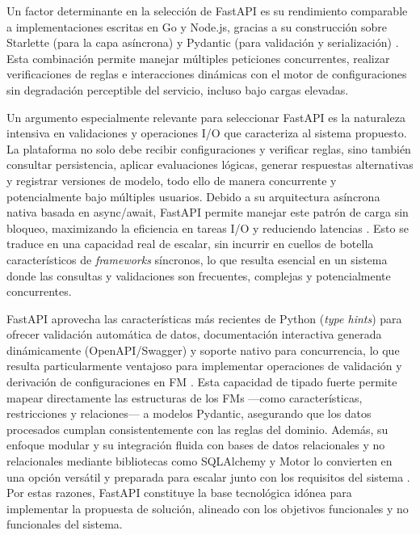 Un factor determinante en la selección de FastAPI es su rendimiento comparable a 
implementaciones escritas en Go y Node.js, gracias a su construcción sobre Starlette 
(para la capa asíncrona) y Pydantic (para validación y serialización) \citep{pesce2021benchmark}. 
Esta combinación permite manejar múltiples peticiones concurrentes, realizar verificaciones 
de reglas e interacciones dinámicas con el motor de configuraciones sin degradación perceptible 
del servicio, incluso bajo cargas elevadas.

Un argumento especialmente relevante para seleccionar FastAPI es la naturaleza 
intensiva en validaciones y operaciones \ac{I/O} que caracteriza al sistema propuesto. 
La plataforma no solo debe recibir configuraciones y verificar reglas, sino también 
consultar persistencia, aplicar evaluaciones lógicas, generar respuestas alternativas y 
registrar versiones de modelo, todo ello de manera concurrente y potencialmente bajo 
múltiples usuarios. Debido a su arquitectura asíncrona nativa basada en async/await, 
FastAPI permite manejar este patrón de carga sin bloqueo, maximizando la eficiencia en 
tareas \ac{I/O} y reduciendo latencias \citep{eugene2023fastapi, pesce2021benchmark}. Esto se 
traduce en una capacidad real de escalar, sin incurrir en cuellos de botella característicos 
de \textit{frameworks} síncronos, lo que resulta esencial en un sistema donde las consultas y 
validaciones son frecuentes, complejas y potencialmente concurrentes.

FastAPI aprovecha las características más recientes 
de Python (\textit{type hints}) para ofrecer validación automática de datos, documentación interactiva generada 
dinámicamente (OpenAPI/Swagger) y soporte nativo para concurrencia, lo que resulta particularmente ventajoso 
para implementar operaciones de validación y derivación de configuraciones en \ac{FM} 
\citep{fastapi2023docs}. Esta capacidad de tipado fuerte permite mapear directamente las estructuras de los 
\ac{FM}s —como características, restricciones y relaciones— a modelos Pydantic, asegurando que los datos
procesados cumplan consistentemente con las reglas del dominio. Además, su enfoque modular y su 
integración fluida con bases de datos relacionales y no relacionales mediante bibliotecas como SQLAlchemy y 
Motor lo convierten en una opción versátil y preparada para escalar junto con los requisitos del sistema 
\citep{lubanovic2019python}. Por estas razones, FastAPI constituye la base tecnológica idónea para implementar 
la propuesta de solución, alineado con los objetivos funcionales y no funcionales del sistema.

